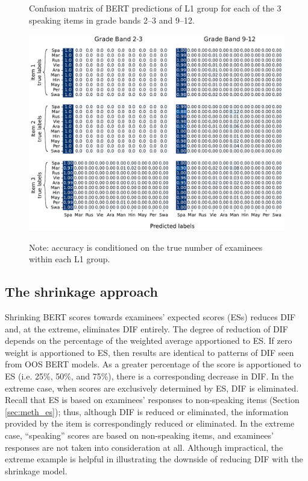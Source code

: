 \documentclass [PhD] {uclathes}
\begin{document}
\begin{figure}[!htb]
    \centering
    \caption{Confusion matrix of BERT predictions of L1 group for each of the 3 speaking items in grade bands 2–3 and 9–12.}    
    \includegraphics[width=6.5in]{figures/20230516_language805_heatmap_edit.pdf}
    \label{heatmap_lang}
\caption*{\small Note: accuracy is conditioned on the true number of examinees within each L1 group.}

\end{figure}

\subsection{The shrinkage approach}

Shrinking BERT scores towards examinees’ expected scores (ESs) reduces DIF and, at the extreme, eliminates DIF entirely. The degree of reduction of DIF depends on the percentage of the weighted average apportioned to ES. If zero weight is apportioned to ES, then results are identical to patterns of DIF seen from OOS BERT models. As a greater percentage of the score is apportioned to ES (i.e. 25\%, 50\%, and 75\%), there is a corresponding decrease in DIF. In the extreme case, when scores are exclusively determined by ES, DIF is eliminated. Recall that ES is based on examinees’ responses to non-speaking items (Section \ref{sec:meth_es}); thus, although DIF is reduced or eliminated, the information provided by the item is correspondingly reduced or eliminated. In the extreme case, “speaking” scores are based on non-speaking items, and examinees’ responses are not taken into consideration at all. Although impractical, the extreme example is helpful in illustrating the downside of reducing DIF with the shrinkage model. 
\end{document}
